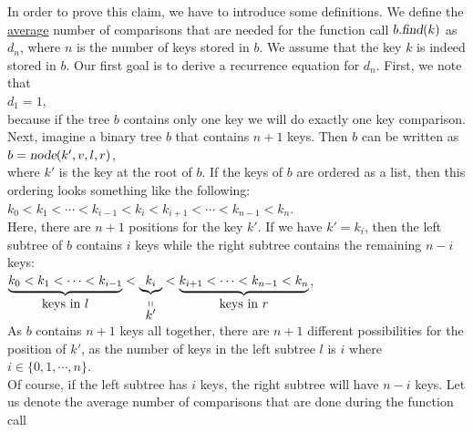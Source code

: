 
In order to prove this claim, we have to introduce some definitions.
We define the \underline{avera}g\underline{e} number of comparisons that are needed for the function
call $b.\textsl{find}(k)$ as  $d_n$, where $n$ is the number of keys stored in $b$.  We assume that
the key $k$ is indeed stored in $b$.  Our first goal is to derive a recurrence equation for 
$d_n$.  First, we note that  
\\[0.2cm]
\hspace*{1.3cm} $d_1 = 1$,
\\[0.2cm]
because if the tree $b$ contains only one key we will do exactly one key comparison.
Next, imagine a binary tree $b$ that contains $n+1$ keys.  Then $b$
can be written as 
\\[0.2cm]
\hspace*{1.3cm}
$b = \textsl{node}(k',v,l,r)$,
\\[0.2cm]
where $k'$ is the key at the root of $b$.  If the keys of $b$ are ordered as a list, then this
ordering looks something like the following:
\\[0.2cm]
\hspace*{1.3cm}
$k_0 < k_1 < \cdots < k_{i-1} < k_{i} < k_{i+1} < \cdots < k_{n-1} < k_n$.
\\[0.2cm]
Here, there are $n+1$ positions for the key $k'$.
If we have $k' = k_i$, then the left subtree of $b$ contains  $i$ keys while the right subtree
contains the remaining  $n-i$ keys:
\\[0.2cm]
\hspace*{1.3cm}
$\underbrace{k_0 < k_1 < \cdots < k_{i-1}}_{\mbox{keys in $l$}} < 
 \underbrace{k_{i}}_{\stackrel{\displaystyle \shortparallel}{\displaystyle k'}} < 
 \underbrace{k_{i+1} < \cdots < k_{n-1} < k_n}_{\mbox{keys in $r$}}$,
\\[0.2cm]
As  $b$ contains $n+1$ keys all together, there are  $n+1$ different possibilities for the position
of $k'$, as the number of keys in the left subtree $l$ is $i$ where
\\[0.2cm]
\hspace*{1.3cm}
 $i \in \{0,1, \cdots, n\}$.
\\[0.2cm]
Of course, if the left subtree has $i$ keys, the right subtree will have $n-i$ keys.
Let us denote the average number of comparisons that are done during the function call

